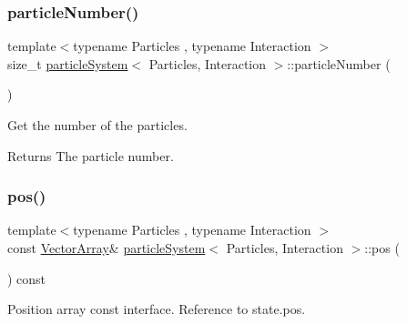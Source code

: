 \mbox{\label{classparticle_system_a859f7ca9a229b8b934ba1de2607b878a}} 
\subsubsection{\texorpdfstring{particle\+Number()}{particleNumber()}}
{\footnotesize\ttfamily template$<$typename Particles , typename Interaction $>$ \\
size\+\_\+t \mbox{\hyperlink{classparticle_system}{particle\+System}}$<$ Particles, Interaction $>$\+::particle\+Number (\begin{DoxyParamCaption}{ }\end{DoxyParamCaption})\hspace{0.3cm}{\ttfamily [inline]}}



Get the number of the particles. 

\begin{DoxyReturn}{Returns}
The particle number. 
\end{DoxyReturn}
\mbox{\label{classparticle_system_a7a4b29e872ff56670d6ad553df57b22b}} 
\subsubsection{\texorpdfstring{pos()}{pos()}\hspace{0.1cm}{\footnotesize\ttfamily [1/2]}}
{\footnotesize\ttfamily template$<$typename Particles , typename Interaction $>$ \\
const \mbox{\hyperlink{classparticle_system_ac8049667a0d05e76b836642503a71c12}{Vector\+Array}}\& \mbox{\hyperlink{classparticle_system}{particle\+System}}$<$ Particles, Interaction $>$\+::pos (\begin{DoxyParamCaption}{ }\end{DoxyParamCaption}) const\hspace{0.3cm}{\ttfamily [inline]}}



Position array const interface. Reference to state.\+pos. 

\mbox{\label{classparticle_system_ae18ea167d5145d52067ae6661a416c4c}} 
